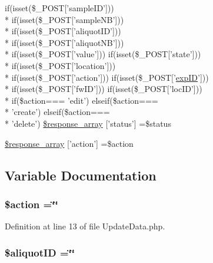 \begin{DoxyCompactItemize}
if(isset(\$\-\_\-\-P\-O\-S\-T\mbox{[}'sample\-I\-D'\mbox{]})) \\*
if(isset(\$\-\_\-\-P\-O\-S\-T\mbox{[}'sample\-N\-B'\mbox{]})) \\*
if(isset(\$\-\_\-\-P\-O\-S\-T\mbox{[}'aliquot\-I\-D'\mbox{]})) \\*
if(isset(\$\-\_\-\-P\-O\-S\-T\mbox{[}'aliquot\-N\-B'\mbox{]})) \\*
if(isset(\$\-\_\-\-P\-O\-S\-T\mbox{[}'value'\mbox{]})) if(isset(\$\-\_\-\-P\-O\-S\-T\mbox{[}'state'\mbox{]})) \\*
if(isset(\$\-\_\-\-P\-O\-S\-T\mbox{[}'location'\mbox{]})) \\*
if(isset(\$\-\_\-\-P\-O\-S\-T\mbox{[}'action'\mbox{]})) if(isset(\$\-\_\-\-P\-O\-S\-T\mbox{[}'\hyperlink{admin_rawdata_8php_a888d53a6517f4272b5982c3ca9d16e8a}{exp\-I\-D}'\mbox{]})) \\*
if(isset(\$\-\_\-\-P\-O\-S\-T\mbox{[}'fw\-I\-D'\mbox{]})) if(isset(\$\-\_\-\-P\-O\-S\-T\mbox{[}'loc\-I\-D'\mbox{]})) \\*
if(\$action=== 'edit') elseif(\$action=== \\*
'create') elseif(\$action=== \\*
'delete') \hyperlink{_update_data_8php_adaa42b6993796ea8225ce000539856d9}{\$response\-\_\-array} \mbox{[}'status'\mbox{]} =\$status
\item 
\hyperlink{_update_data_8php_ae768978a0cdc416c0d63d798c85c8784}{\$response\-\_\-array} \mbox{[}'action'\mbox{]} =\$action
\end{DoxyCompactItemize}


\subsection{Variable Documentation}
\hypertarget{_update_data_8php_aa698a3e72116e8e778be0e95d908ee30}{
\subsubsection[{\$action}]{\setlength{\rightskip}{0pt plus 5cm}\$action =\char`\"{}\char`\"{}}}\label{_update_data_8php_aa698a3e72116e8e778be0e95d908ee30}


Definition at line 13 of file Update\-Data.\-php.

\hypertarget{_update_data_8php_a54b5731b97b1351783471e68775046b5}{
\subsubsection[{\$aliquot\-I\-D}]{\setlength{\rightskip}{0pt plus 5cm}\$aliquot\-I\-D =\char`\"{}\char`\"{}}}\label{_update_data_8php_a54b5731b97b1351783471e68775046b5}


